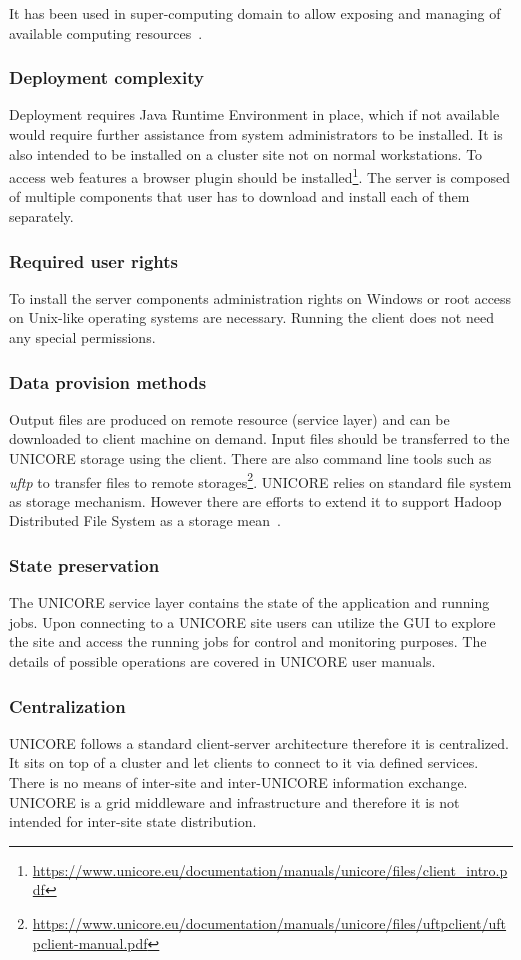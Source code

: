 It has been used in super-computing domain to allow exposing and managing of available 
computing resources~\cite{unicore_arch}.

\subsubsection {Deployment complexity}
Deployment requires Java Runtime Environment in place, which if not available would require 
further assistance from system administrators to be installed. It is also intended to be installed
on a cluster site not on normal workstations. To access web features a browser plugin should be
installed\footnote{
\url{https://www.unicore.eu/documentation/manuals/unicore/files/client_intro.pdf}}.
The server is composed of multiple components that user 
has to download and install each of them separately.
\subsubsection {Required user rights}
To install the server components administration rights on Windows or root access on Unix-like operating
systems are necessary. Running the client does not need any special permissions.
\subsubsection{Data provision methods}
Output files are produced on remote resource (service layer) and can be downloaded to client
machine on demand. Input files should be transferred to the UNICORE storage using the client.
There are also command line tools such as \textit{uftp} to transfer files to remote 
storages\footnote{
\url{https://www.unicore.eu/documentation/manuals/unicore/files/uftpclient/uftpclient-manual.pdf}}.
UNICORE relies on standard file system as storage mechanism. However there are efforts to 
extend it to support Hadoop Distributed File System as a storage mean~\cite{wasim2009}.
\subsubsection {State preservation}
The UNICORE service layer contains the state of the application and running jobs. 
Upon connecting to a UNICORE site users can utilize the GUI to explore 
the site and access the running jobs for control and monitoring purposes.
The details of possible operations are covered in UNICORE user manuals.

\subsubsection {Centralization}
UNICORE follows a standard client-server architecture therefore it is centralized. It sits on 
top of a cluster and let clients to connect to it via defined services. There is no means
of inter-site and inter-UNICORE information exchange. UNICORE is a grid middleware and
infrastructure and therefore it is not intended for inter-site state distribution.

